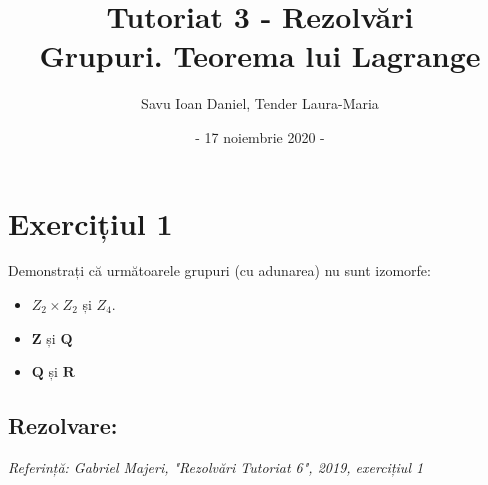 \documentclass{article}
\title{Tutoriat 3 - Rezolvări\\
\Large Grupuri. Teorema lui Lagrange}
\date{- 17 noiembrie 2020 -}
\author{Savu Ioan Daniel, Tender Laura-Maria}
\begin{document}
\maketitle

\section{Exercițiul 1}
Demonstrați că următoarele grupuri (cu adunarea) nu sunt izomorfe:
\begin{itemize}
    \item $Z_{2} \times Z_{2}$ și $Z_{4}$.
    \item $\mathbf{Z}$ și $\mathbf{Q}$
    \item $\mathbf{Q}$ și $\mathbf{R}$
\end{itemize}

\subsection{Rezolvare:}
\begin {small}
\emph{Referință: Gabriel Majeri, "Rezolvări Tutoriat 6", 2019, exercițiul 1}
\end {small}
\end{document}
